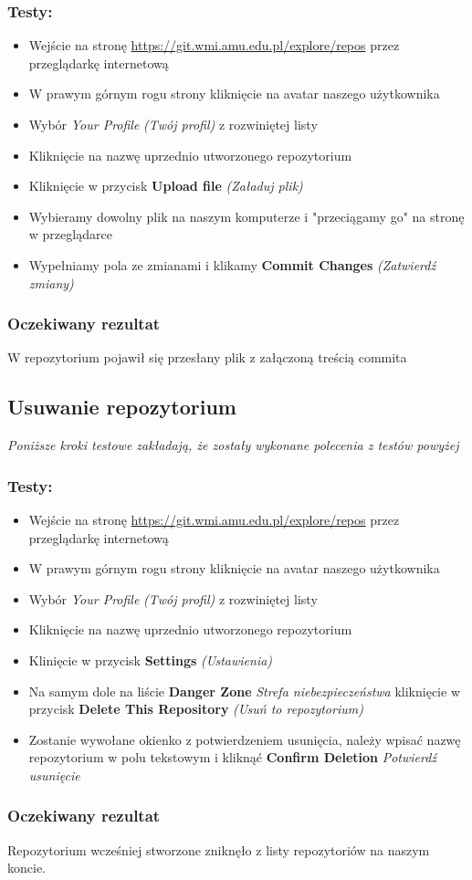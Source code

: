 \documentclass{article}
\begin{document}
\subsubsection*{Testy:}
\begin{itemize}
    \item Wejście na stronę \url{https://git.wmi.amu.edu.pl/explore/repos} przez przeglądarkę internetową
    \item W prawym górnym rogu strony kliknięcie na avatar naszego użytkownika
    \item Wybór \textit{Your Profile} \textit{(Twój profil)} z rozwiniętej listy
    \item Kliknięcie na nazwę uprzednio utworzonego repozytorium
    \item Kliknięcie w przycisk \textbf{Upload file} \textit{(Załaduj plik)}
    \item Wybieramy dowolny plik na naszym komputerze i "przeciągamy go" na stronę w przeglądarce
    \item Wypełniamy pola ze zmianami i klikamy \textbf{Commit Changes} \textit{(Zatwierdź zmiany)}
\end{itemize}
\subsubsection*{Oczekiwany rezultat}
W repozytorium pojawił się przesłany plik z załączoną treścią commita

\newpage
\subsection{Usuwanie repozytorium}
\textit{Poniższe kroki testowe zakładają, że zostały wykonane polecenia z testów powyżej}
\subsubsection*{Testy:}
\begin{itemize}
    \item Wejście na stronę \url{https://git.wmi.amu.edu.pl/explore/repos} przez przeglądarkę internetową
    \item W prawym górnym rogu strony kliknięcie na avatar naszego użytkownika
    \item Wybór \textit{Your Profile} \textit{(Twój profil)} z rozwiniętej listy
    \item Kliknięcie na nazwę uprzednio utworzonego repozytorium
    \item Klinięcie w przycisk \textbf{Settings} \textit{(Ustawienia)}
    \item Na samym dole na liście \textbf{Danger Zone} \textit{Strefa niebezpieczeństwa} kliknięcie w przycisk \textbf{Delete This Repository} \textit{(Usuń to repozytorium)}
    \item Zostanie wywołane okienko z potwierdzeniem usunięcia, należy wpisać nazwę repozytorium w polu tekstowym i kliknąć \textbf{Confirm Deletion} \textit{Potwierdź usunięcie}
\end{itemize}

\subsubsection*{Oczekiwany rezultat}
Repozytorium wcześniej stworzone zniknęło z listy repozytoriów na naszym koncie.
\end{document}
